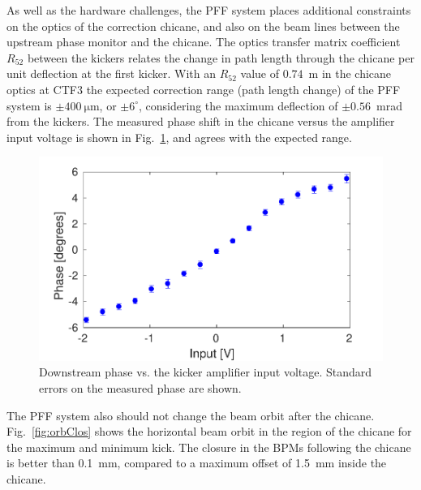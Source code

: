 \documentclass[%
 reprint,
superscriptaddress,
 amsmath,amssymb,
 prl,
]{revtex4-1}
\begin{document}
As well as the hardware challenges, the PFF system places additional 
constraints on the optics of the correction 
chicane, and also on the beam lines between the upstream phase monitor and the 
chicane. %
The optics transfer matrix coefficient \(R_{52}\) between the kickers relates 
the change in path length through the chicane per unit 
deflection at the first kicker. 
With an \(R_{52}\) value of \(0.74\)~m in the chicane optics at 
CTF3 \cite{RobertsThesis} the expected correction range (path length change) of 
the PFF system is \(\pm400~\mathrm{\mu m}\), or \(\pm6^\circ\), considering the 
maximum deflection of \(\pm0.56\)~mrad from the kickers.
The measured phase shift in the chicane versus the amplifier input voltage is 
shown in Fig.~\ref{fig:corrRange}, and agrees with the expected range. 

\begin{figure}
	\includegraphics[width=\columnwidth]{figs/corrRange}
	\caption{\label{fig:corrRange}Downstream phase vs. the kicker amplifier 
	input voltage. Standard errors on the measured phase are shown.}
\end{figure}

The PFF system also should not change the beam orbit after the chicane. 
Fig.~\ref{fig:orbClos} shows the horizontal beam orbit in the region 
of the chicane for the maximum and minimum kick. The closure in 
the BPMs following the chicane is better than 0.1~mm, compared to a maximum 
offset of 1.5~mm inside the chicane.
\end{document}
